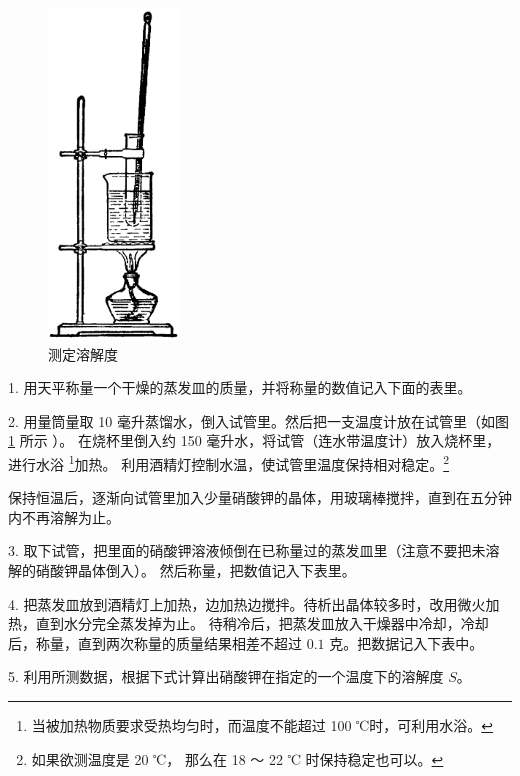 \begin{shiyanbuzhou}
    \begin{figure}
        \centering
        \includegraphics[width=3.5cm]{../pic/czhx1-xssy-28}
        \caption{测定溶解度}\label{fig:xssy-28}
    \end{figure}

    1. 用天平称量一个干燥的蒸发皿的质量，并将称量的数值记入下面的表里。

    2. 用量筒量取 10 毫升蒸馏水，倒入试管里。然后把一支温度计放在试管里（如图 \ref{fig:xssy-28} 所示 ）。
    在烧杯里倒入约 150 毫升水，将试管（连水带温度计）放入烧杯里，进行水浴%
    \footnote{当被加热物质要求受热均匀时，而温度不能超过 100 ℃时，可利用水浴。}加热。
    利用酒精灯控制水温，使试管里温度保持相对稳定。\footnote{如果欲测温度是 20 ℃， 那么在 18 ～ 22 ℃ 时保持稳定也可以。}

    保持恒温后，逐渐向试管里加入少量硝酸钾的晶体，用玻璃棒搅拌，直到在五分钟内不再溶解为止。

    3. 取下试管，把里面的硝酸钾溶液倾倒在已称量过的蒸发皿里（注意不要把未溶解的硝酸钾晶体倒入）。
    然后称量，把数值记入下表里。

    4. 把蒸发皿放到酒精灯上加热，边加热边搅拌。待析出晶体较多时，改用微火加热，直到水分完全蒸发掉为止。
    待稍冷后，把蒸发皿放入干燥器中冷却，冷却后，称量，直到两次称量的质量结果相差不超过 $0.1$ 克。把数据记入下表中。

    5. 利用所测数据，根据下式计算出硝酸钾在指定的一个温度下的溶解度 $S$。


\end{shiyanbuzhou}
